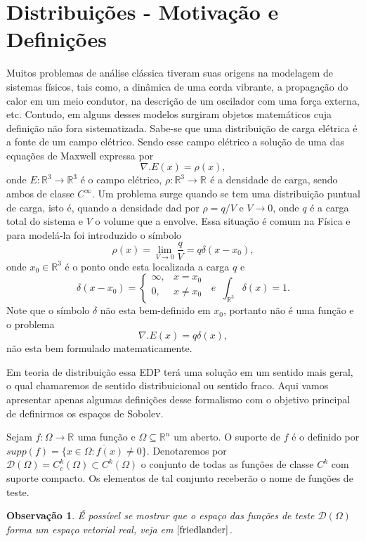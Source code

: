 \documentclass[12pt]{book}
\newtheorem{observacao}[teorema]{Observação}
\newcommand{\funcaocond}[5]{
	#1 = 
	\left\{
	\begin{array}{cc}
		#2, & #3\\
		#4, & #5\\
	\end{array}
	\right.
}
\newcommand{\funcoesdiferenciaveis}[2]{C^{#1}(#2)}
\newcommand{\funcoesdiferenciaveissupp}[2]{C^{#1}_{c}(#2)}
\newcommand{\funcoesteste}{\mathcal{D}(\Omega)}
\newcommand{\real}[1]{\mathbb{R}^{#1}}
\newcommand{\reta}{\real{}}
\begin{document}
	\section{Distribuições - Motivação e Definições}
	Muitos problemas de análise clássica tiveram suas origens na modelagem de sistemas físicos, tais como, a dinâmica de uma corda vibrante, a propagação do calor em um meio condutor, na descrição de um oscilador com uma força externa, etc. Contudo, em alguns desses modelos surgiram objetos matemáticos cuja definição não fora sistematizada. Sabe-se que uma distribuição de carga elétrica é a fonte de um campo elétrico. Sendo esse campo elétrico a solução de uma das equações de Maxwell expressa por
	$$
	\nabla.E(x) = \rho(x),
	$$
	onde $E:\real{3} \to \real{3}$ é o campo elétrico, $\rho:\real{3}\to \reta$ é a densidade de carga, sendo ambos de classe $C^{\infty}$. Um problema surge quando se tem uma distribuição puntual de carga, isto é, quando a densidade dad por $\rho = q/V$ e $V \to 0$, onde $q$ é a carga total do sistema e $V$ o volume que a envolve. Essa situação é comum na Física e para modelá-la foi introduzido o símbolo
	$$
	\rho(x) = \lim_{V\to 0} \frac{q}{V} = q\delta(x - x_{0}),
	$$
	onde $x_{0} \in \real{3}$ é o ponto onde esta localizada a carga $q$ e 
	$$
	\funcaocond{\delta(x - x_{0})}{\infty}{x=x_{0}}{0}{x\neq x_{0}}\;\; e \;\; \int_{\real{3}} \delta(x) = 1.
	$$
	Note que o símbolo $\delta$ não esta bem-definido em $x_{0}$, portanto não é uma função e o problema 
	$$
	\nabla.E(x) = q\delta(x),
	$$
	não esta bem formulado matematicamente. 
	
	Em teoria de distribuição essa EDP terá uma solução em um sentido mais geral, o qual chamaremos de sentido distribuicional ou sentido fraco. Aqui vamos apresentar apenas algumas definições desse formalismo com o objetivo principal de definirmos os espaços de Sobolev.
	
	Sejam $f:\Omega\to \reta$ uma função e $\Omega \subseteq \real{n}$ um aberto. O suporte de $f$ é o definido por $supp(f) = \overline{\{ x\in \Omega: f(x)\neq 0 \}}$. Denotaremos por $\funcoesteste=\funcoesdiferenciaveissupp{k}{\Omega} \subset \funcoesdiferenciaveis{k}{\Omega}$ o conjunto de todas as funções de classe $C^{k}$ com suporte compacto. Os elementos de tal conjunto receberão o nome de funções de teste.
	
	\begin{observacao}
		É possível se mostrar que o espaço das funções de teste $\funcoesteste$ forma um espaço vetorial real, veja em $\cite{friedlander}$.
	\end{observacao}
	
\end{document}
